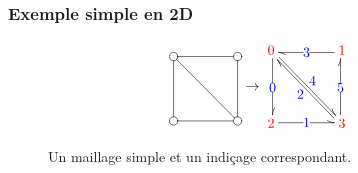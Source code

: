 \documentclass[]{article}
\begin{document}
\subsubsection*{Exemple simple en 2D}

\begin{figure}[H]
	\[\begin{aligned}[c]
			\entrymodifiers={+[o][F]}
			\renewcommand{\labelstyle}{\textstyle}
			\xymatrix@=4em @L=.25ex{
			{}
			\ar @^{-} [d]
			\ar @^{-} [dr]
			 & {}
			\ar @^{-} [l]
			\\ {}
			\ar @^{-} [r]
			 & {}
			\ar @^{-} [u]
			}
		\end{aligned}\rightarrow\begin{aligned}[c]
			\xymatrix@=4em @L=.25ex{
			{\color{red}0}
			\ar @<.25ex> @^{->} [d] |{\color{blue}0}
			\ar @<.25ex> @^{->} [dr] ^{\color{blue}4}
			 & {\color{red}1}
			\ar @<.25ex> @^{->} [l] |{\color{blue}3}
			\\ {\color{red}2}
			\ar @<.25ex> @^{->} [r] |{\color{blue}1}
			 & {\color{red}3}
			\ar @<.25ex> @^{->} [ul] ^{\color{blue}2}
			\ar @<.25ex> @^{->} [u] |{\color{blue}5}
			}
		\end{aligned}\]
	\caption{Un maillage simple et un indiçage correspondant.}
	\label{maillage_simple}
\end{figure}
\end{document}
